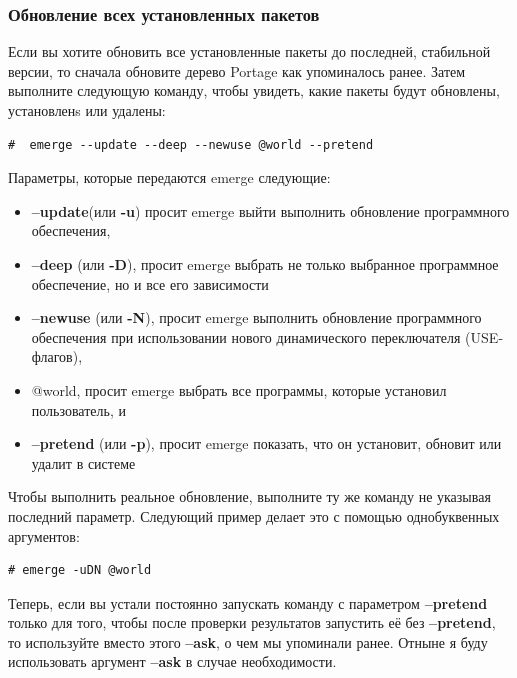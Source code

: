 \documentclass[10pt]{book}
\begin{document}
\subsubsection{Обновление всех установленных пакетов}

Если вы хотите обновить все установленные пакеты до последней, стабильной версии, то сначала обновите дерево Portage как упоминалось ранее. Затем выполните следующую команду, чтобы увидеть, какие пакеты будут обновлены, установленs или удалены:

\begin{tcolorbox}
\begin{lstlisting}
#  emerge --update --deep --newuse @world --pretend
\end{lstlisting}
\end{tcolorbox}

Параметры, которые передаются emerge следующие:

\begin{itemize} 
\item \textbf{--update}(или \textbf{-u}) просит emerge выйти выполнить обновление программного обеспечения,
\item \textbf{ --deep} (или \textbf{-D}), просит emerge выбрать не только выбранное программное обеспечение, но и все его
зависимости
\item \textbf{ --newuse} (или \textbf{-N}), просит emerge выполнить обновление программного обеспечения при использовании нового динамического переключателя (USE-флагов),
\item @world, просит emerge выбрать все программы, которые установил пользователь, и
\item \textbf{ --pretend} (или \textbf{-p}), просит emerge показать, что он установит, обновит или удалит в системе
\end{itemize}

Чтобы выполнить реальное обновление, выполните ту же команду не указывая последний параметр. Следующий пример делает это с помощью однобуквенных аргументов:

\begin{tcolorbox}
\begin{lstlisting}
# emerge -uDN @world
\end{lstlisting}
\end{tcolorbox}

Теперь, если вы устали постоянно запускать команду с параметром \textbf{--pretend} только для того, чтобы после проверки результатов запустить её без \textbf{--pretend}, то  используйте вместо этого \textbf{--ask}, о чем мы упоминали ранее. Отныне я буду использовать аргумент \textbf{--ask} в случае необходимости. 
\end{document}
